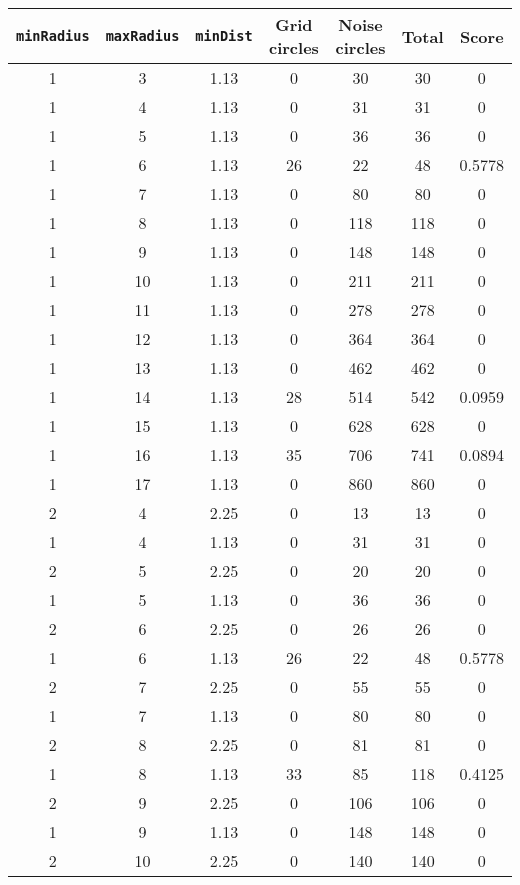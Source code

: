 \documentclass[letterpaper, 12pt]{article}
\begin{document}
\begin{longtable}{|c|c|c|c|c|c|c|}
\hline
\textbf{\texttt{minRadius}} & \textbf{\texttt{maxRadius}} & \textbf{\texttt{minDist}} & \textbf{Grid circles} & \textbf{Noise circles} & \textbf{Total} & \textbf{Score} \\
\hline
1 & 3 & 1.13 & 0 & 30 & 30 & 0 \\
\hline
1 & 4 & 1.13 & 0 & 31 & 31 & 0 \\
\hline
1 & 5 & 1.13 & 0 & 36 & 36 & 0 \\
\hline
1 & 6 & 1.13 & 26 & 22 & 48 & 0.5778 \\
\hline
1 & 7 & 1.13 & 0 & 80 & 80 & 0 \\
\hline
1 & 8 & 1.13 & 0 & 118 & 118 & 0 \\
\hline
1 & 9 & 1.13 & 0 & 148 & 148 & 0 \\
\hline
1 & 10 & 1.13 & 0 & 211 & 211 & 0 \\
\hline
1 & 11 & 1.13 & 0 & 278 & 278 & 0 \\
\hline
1 & 12 & 1.13 & 0 & 364 & 364 & 0 \\
\hline
1 & 13 & 1.13 & 0 & 462 & 462 & 0 \\
\hline
1 & 14 & 1.13 & 28 & 514 & 542 & 0.0959 \\
\hline
1 & 15 & 1.13 & 0 & 628 & 628 & 0 \\
\hline
1 & 16 & 1.13 & 35 & 706 & 741 & 0.0894 \\
\hline
1 & 17 & 1.13 & 0 & 860 & 860 & 0 \\
\hline
2 & 4 & 2.25 & 0 & 13 & 13 & 0 \\
\hline
1 & 4 & 1.13 & 0 & 31 & 31 & 0 \\
\hline
2 & 5 & 2.25 & 0 & 20 & 20 & 0 \\
\hline
1 & 5 & 1.13 & 0 & 36 & 36 & 0 \\
\hline
2 & 6 & 2.25 & 0 & 26 & 26 & 0 \\
\hline
1 & 6 & 1.13 & 26 & 22 & 48 & 0.5778 \\
\hline
2 & 7 & 2.25 & 0 & 55 & 55 & 0 \\
\hline
1 & 7 & 1.13 & 0 & 80 & 80 & 0 \\
\hline
2 & 8 & 2.25 & 0 & 81 & 81 & 0 \\
\hline
1 & 8 & 1.13 & 33 & 85 & 118 & 0.4125 \\
\hline
2 & 9 & 2.25 & 0 & 106 & 106 & 0 \\
\hline
1 & 9 & 1.13 & 0 & 148 & 148 & 0 \\
\hline
2 & 10 & 2.25 & 0 & 140 & 140 & 0 \\

\end{longtable}
\end{document}
